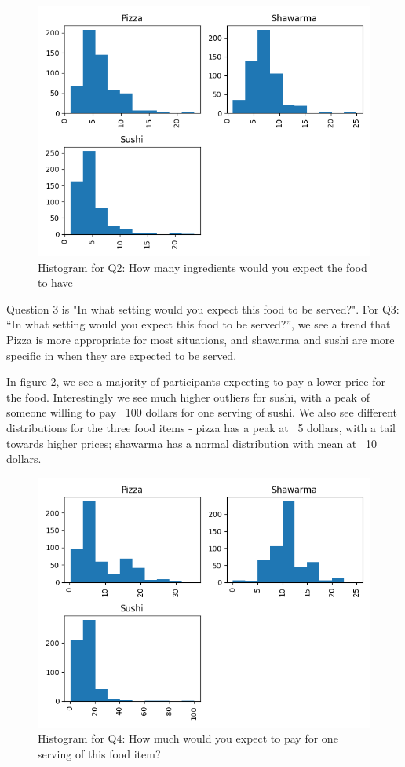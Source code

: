 \begin{figure}[h]
    \centerline{\includegraphics[width=\columnwidth]{data/histogram_Q2.png}}
    \caption{Histogram for Q2: How many ingredients would you expect the food to have}
    \label{f:hist_q2}
\end{figure}

Question 3 is "In what setting would you expect this food to be served?". 
For Q3: “In what setting would you expect this food to be served?”, we see a trend that Pizza is more appropriate for most situations, and shawarma and sushi are more specific in when they are expected to be served.



In figure \ref{f:hist_q4}, we see a majority of participants expecting to pay a lower price for the food. 
Interestingly we see much higher outliers for sushi, with a peak of someone willing to pay ~100 dollars 
for one serving of sushi. We also see different distributions for the three food items - pizza has a peak at 
~5 dollars, with a tail towards higher prices; shawarma has a normal distribution with mean at ~10 dollars.
\begin{figure}[h]
    \centerline{\includegraphics[width=\columnwidth]{data/histogram_Q4.png}}
    \caption{Histogram for Q4: How much would you expect to pay for one serving of this food item?}
    \label{f:hist_q4}
\end{figure}


